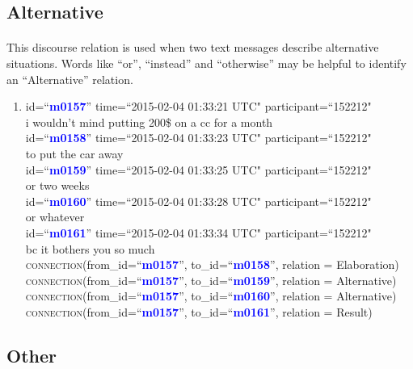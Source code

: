 \documentclass{article}
\begin{document}
\subsection{Alternative}
\paragraph{}
This discourse relation is used when two text messages describe alternative situations. Words like ``or'', ``instead'' and ``otherwise'' may be helpful to identify an ``Alternative'' relation. 
\begin{enumerate}[resume]
\item id=``\textbf{\textcolor{blue}{m0157}}'' time=``2015-02-04 01:33:21 UTC" participant=``152212"\\
i wouldn’t mind putting 200\$ on a cc for a month \\
id=``\textbf{\textcolor{blue}{m0158}}'' time=``2015-02-04 01:33:23 UTC" participant=``152212"\\
to put the car away\\
id=``\textbf{\textcolor{blue}{m0159}}'' time=``2015-02-04 01:33:25 UTC" participant=``152212"\\
or two weeks\\
id=``\textbf{\textcolor{blue}{m0160}}'' time=``2015-02-04 01:33:28 UTC" participant=``152212"\\
or whatever\\
id=``\textbf{\textcolor{blue}{m0161}}'' time=``2015-02-04 01:33:34 UTC" participant=``152212"\\
bc it bothers you so much\\
\textsc{connection}(from\_id=``\textbf{\textcolor{blue}{m0157}}'', to\_id=``\textbf{\textcolor{blue}{m0158}}'', relation = Elaboration)\\
\textsc{connection}(from\_id=``\textbf{\textcolor{blue}{m0157}}'', to\_id=``\textbf{\textcolor{blue}{m0159}}'', relation = Alternative)\\
\textsc{connection}(from\_id=``\textbf{\textcolor{blue}{m0157}}'', to\_id=``\textbf{\textcolor{blue}{m0160}}'', relation = Alternative)\\
\textsc{connection}(from\_id=``\textbf{\textcolor{blue}{m0157}}'', to\_id=``\textbf{\textcolor{blue}{m0161}}'', relation = Result)\\
\end{enumerate}

\subsection{Other}
\end{document}
